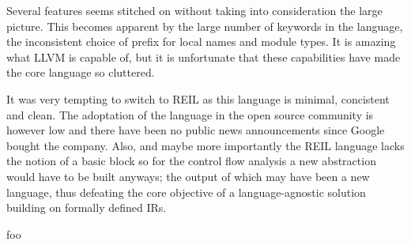Several features seems stitched on without taking into consideration the large picture. This becomes apparent by the large number of keywords in the language, the inconsistent choice of prefix for local names and module types. It is amazing what LLVM is capable of, but it is unfortunate that these capabilities have made the core language so cluttered.

It was very tempting to switch to REIL as this language is minimal, concistent and clean. The adoptation of the language in the open source community is however low and there have been no public news announcements since Google bought the company. Also, and maybe more importantly the REIL language lacks the notion of a basic block so for the control flow analysis a new abstraction would have to be built anyways; the output of which may have been a new language, thus defeating the core objective of a language-agnostic solution building on formally defined IRs.


foo
